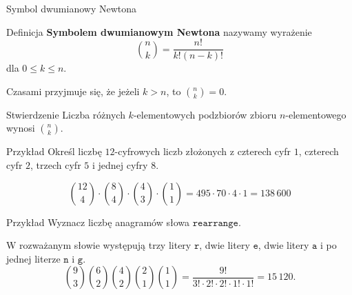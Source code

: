 \documentclass[a4paper,10pt]{beamer}
\begin{document}
\begin{frame}{Symbol dwumianowy Newtona}

\begin{block}{Definicja}
	{\bf Symbolem dwumianowym Newtona} nazywamy wyrażenie $${n \choose k}=\frac{n!}{k!(n-k)!}$$ dla $0\leq k\leq n$.
\end{block}

\medskip

Czasami przyjmuje się, że jeżeli $k>n$, to $\displaystyle{n\choose k}=0$.

\medskip

\begin{block}{Stwierdzenie}
	Liczba różnych $k$-elementowych podzbiorów zbioru $n$-elementowego wynosi $\displaystyle {n\choose k}$.
\end{block}

\end{frame}



\begin{frame}
\begin{exampleblock}{Przykład}
Określ liczbę $12$-cyfrowych liczb złożonych z czterech cyfr $1$, czterech cyfr $2$, trzech cyfr $5$ i jednej cyfry $8$.

$${12\choose4}\cdot{8\choose4}\cdot{4\choose3}\cdot{1\choose1}=495\cdot70\cdot4\cdot1=138\,600$$
\end{exampleblock}

\bigskip

\begin{exampleblock}{Przykład}
Wyznacz liczbę anagramów słowa $\mathtt{rearrange}$.

\medskip
W rozważanym słowie występują trzy litery $\mathtt{r}$, dwie litery $\mathtt{e}$, dwie litery $\mathtt{a}$ i po jednej literze $\mathtt{n}$ i $\mathtt{g}$.
$${9\choose3}{6\choose2}{4\choose2}{2\choose1}{1\choose1}=\frac{9!}{3!\cdot2!\cdot2!\cdot1!\cdot1!}=15\,120.$$
\end{exampleblock}
\end{frame}
\end{document}
